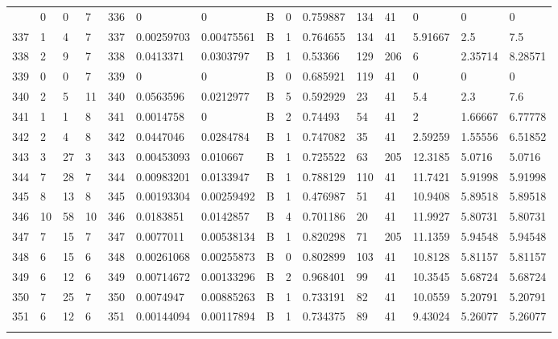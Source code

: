 \begin{latin}
\begin{longtable}{lllllllllllllll}
\begin{comment}
	336 & 0  & 0   & 7  & 336 & 0              & 0              & B & 0  & 0.759887 & 134  & 41   & 0       & 0       & 0       \\
	337 & 1  & 4   & 7  & 337 & 0.00259703     & 0.00475561     & B & 1  & 0.764655 & 134  & 41   & 5.91667 & 2.5     & 7.5     \\
	338 & 2  & 9   & 7  & 338 & 0.0413371      & 0.0303797      & B & 1  & 0.53366  & 129  & 206  & 6       & 2.35714 & 8.28571 \\
	339 & 0  & 0   & 7  & 339 & 0              & 0              & B & 0  & 0.685921 & 119  & 41   & 0       & 0       & 0       \\
	340 & 2  & 5   & 11 & 340 & 0.0563596      & 0.0212977      & B & 5  & 0.592929 & 23   & 41   & 5.4     & 2.3     & 7.6     \\
	341 & 1  & 1   & 8  & 341 & 0.0014758      & 0              & B & 2  & 0.74493  & 54   & 41   & 2       & 1.66667 & 6.77778 \\
	342 & 2  & 4   & 8  & 342 & 0.0447046      & 0.0284784      & B & 1  & 0.747082 & 35   & 41   & 2.59259 & 1.55556 & 6.51852 \\
	343 & 3  & 27  & 3  & 343 & 0.00453093     & 0.010667       & B & 1  & 0.725522 & 63   & 205  & 12.3185 & 5.0716  & 5.0716  \\
	344 & 7  & 28  & 7  & 344 & 0.00983201     & 0.0133947      & B & 1  & 0.788129 & 110  & 41   & 11.7421 & 5.91998 & 5.91998 \\
	345 & 8  & 13  & 8  & 345 & 0.00193304     & 0.00259492     & B & 1  & 0.476987 & 51   & 41   & 10.9408 & 5.89518 & 5.89518 \\
	346 & 10 & 58  & 10 & 346 & 0.0183851      & 0.0142857      & B & 4  & 0.701186 & 20   & 41   & 11.9927 & 5.80731 & 5.80731 \\
	347 & 7  & 15  & 7  & 347 & 0.0077011      & 0.00538134     & B & 1  & 0.820298 & 71   & 205  & 11.1359 & 5.94548 & 5.94548 \\
	348 & 6  & 15  & 6  & 348 & 0.00261068     & 0.00255873     & B & 0  & 0.802899 & 103  & 41   & 10.8128 & 5.81157 & 5.81157 \\
	349 & 6  & 12  & 6  & 349 & 0.00714672     & 0.00133296     & B & 2  & 0.968401 & 99   & 41   & 10.3545 & 5.68724 & 5.68724 \\
	350 & 7  & 25  & 7  & 350 & 0.0074947      & 0.00885263     & B & 1  & 0.733191 & 82   & 41   & 10.0559 & 5.20791 & 5.20791 \\
	351 & 6  & 12  & 6  & 351 & 0.00144094     & 0.00117894     & B & 1  & 0.734375 & 89   & 41   & 9.43024 & 5.26077 & 5.26077 \\

\end{comment}
\end{longtable}
\end{latin}
